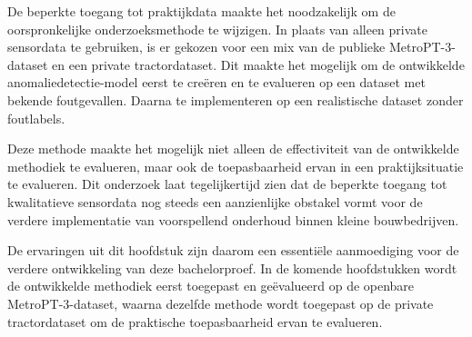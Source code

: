 De beperkte toegang tot praktijkdata maakte het noodzakelijk om de oorspronkelijke onderzoeksmethode te wijzigen. In plaats van alleen private sensordata te gebruiken, is er gekozen voor een mix van de publieke MetroPT-3-dataset en een private tractordataset. Dit maakte het mogelijk om de ontwikkelde anomaliedetectie-model eerst te creëren en te evalueren op een dataset met bekende foutgevallen. Daarna te implementeren op een realistische dataset zonder foutlabels.

Deze methode maakte het mogelijk niet alleen de effectiviteit van de ontwikkelde methodiek te evalueren, maar ook de toepasbaarheid ervan in een praktijksituatie te evalueren. Dit onderzoek laat tegelijkertijd zien dat de beperkte toegang tot kwalitatieve sensordata nog steeds een aanzienlijke obstakel vormt voor de verdere implementatie van voorspellend onderhoud binnen kleine bouwbedrijven.

De ervaringen uit dit hoofdstuk zijn daarom een essentiële aanmoediging voor de verdere ontwikkeling van deze bachelorproef. In de komende hoofdstukken wordt de ontwikkelde methodiek eerst toegepast en geëvalueerd op de openbare MetroPT-3-dataset, waarna dezelfde methode wordt toegepast op de private tractordataset om de praktische toepasbaarheid ervan te evalueren. 




